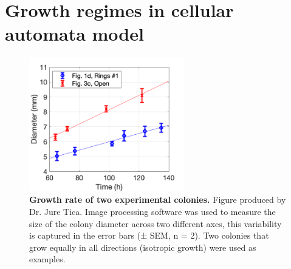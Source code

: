 \chapter{Growth regimes in cellular automata model}\label{appendix_growth_rates}
\begin{figure}[H] %
    \centering
    \begin{adjustbox}{center}
        \includegraphics[width=0.6\textwidth]{chapters/Appendix/fig_growth_curves_e20210611} %
    \end{adjustbox}
    \caption{\textbf{Growth rate of two experimental colonies.} Figure produced by Dr. Jure Tica. Image processing software was used to measure the size of the colony diameter across two different axes, this variability is captured in the error bars (± SEM, n = 2). Two colonies that grow equally in all directions (isotropic growth) were used as examples.}
    \label{fig:fig_growth_curves_e20210611}
\end{figure}

